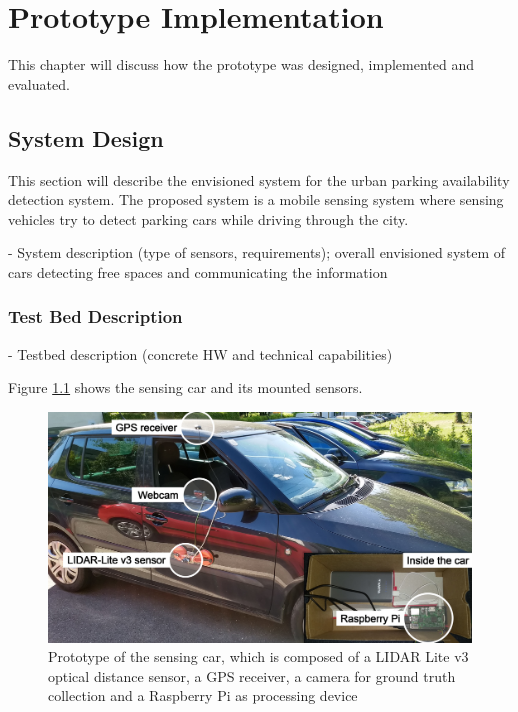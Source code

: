 \chapter{Prototype Implementation}
\label{chap:referenceimplementation}

This chapter will discuss how the prototype was designed, implemented and evaluated. 

\section{System Design}
\label{sec:system_design}

This section will describe the envisioned system for the urban parking availability detection system. The proposed system is a mobile sensing system where sensing vehicles try to detect parking cars while driving through the city. 

- System description (type of sensors, requirements); overall envisioned system of cars detecting free spaces and communicating the information

\subsection{Test Bed Description}
\label{sec:test_bed}

- Testbed description (concrete HW and technical capabilities)

Figure \ref{fig:sensing_car} shows the sensing car and its mounted sensors. 

\begin{figure}
	\centering
	\includegraphics[width=\textwidth]{img/car.jpg}
	\caption{Prototype of the sensing car, which is composed of a LIDAR Lite v3 optical distance sensor, a GPS receiver, a camera for ground truth collection and a Raspberry Pi as processing device}
	\label{fig:sensing_car}
\end{figure}


